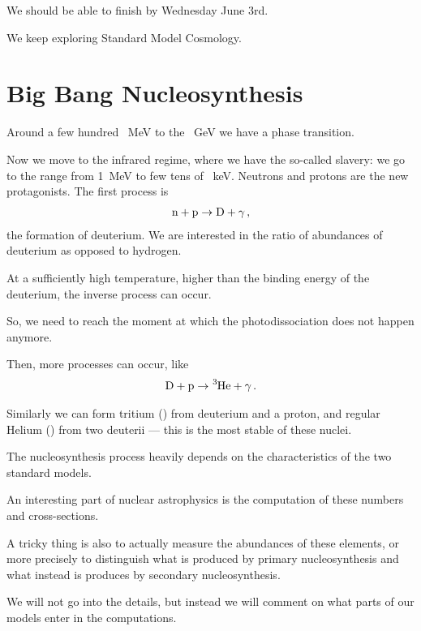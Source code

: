 \documentclass[main.tex]{subfiles}
\begin{document}

We should be able to finish by Wednesday June 3rd. 

We keep exploring Standard Model Cosmology. 

\section{Big Bang Nucleosynthesis}

Around a few hundred \SI{}{MeV} to the \SI{}{GeV} we have a phase transition. 

Now we move to the infrared regime, where we have the so-called slavery: we go to the range from \SI{1}{MeV} to few tens of \SI{}{keV}. 
Neutrons and protons are the new protagonists.
The first process is 
%
\begin{align}
\ce{n} + \ce{p} \to \ce{D} + \gamma 
\,,
\end{align}
%
the formation of deuterium. 
We are interested in the ratio of abundances of deuterium as opposed to hydrogen. 

At a sufficiently high temperature, higher than the binding energy of the deuterium, the inverse process can occur. 

So, we need to reach the moment at which the photodissociation does not happen anymore. 

Then, more processes can occur, like 
%
\begin{align}
\ce{D} + \ce{p} \to \ce{^{3}He} + \gamma 
\,.
\end{align}

Similarly we can form tritium () from deuterium and a proton, and regular Helium () from two deuterii --- this is the most stable of these nuclei.

The nucleosynthesis process heavily depends on the characteristics of the two standard models. 

An interesting part of nuclear astrophysics is the computation of these numbers and cross-sections.

A tricky thing is also to actually measure the abundances of these elements, or more precisely to distinguish what is produced by primary nucleosynthesis and what instead is produces by secondary nucleosynthesis. 

We will not go into the details, but instead we will comment on what parts of our models enter in the computations. 
\end{document}

